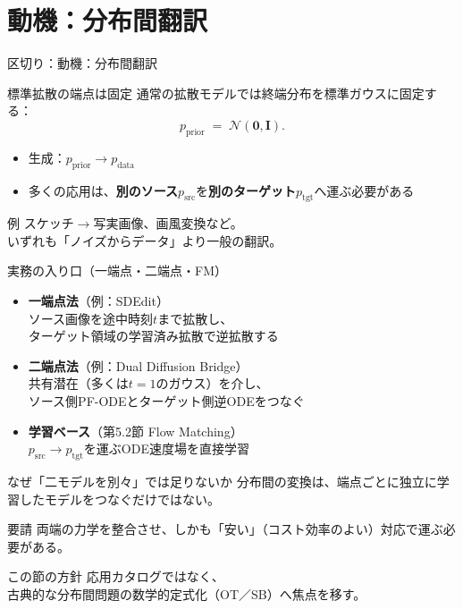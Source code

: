 \section{動機：分布間翻訳}
\asmain
\begin{frame}{区切り：動機：分布間翻訳}
    \tableofcontents[currentsection]
\end{frame}
\asmain
\begin{frame}{標準拡散の端点は固定}
    通常の拡散モデルでは終端分布を標準ガウスに固定する：
    \[
        p_{\mathrm{prior}}
        \;=\;
        \mathcal{N}(\bm{0},\bm{I}).
    \]
    \begin{itemize}
        \item 生成：$p_{\mathrm{prior}}\to p_{\mathrm{data}}$
        \item 多くの応用は、\textbf{別のソース}$p_{\mathrm{src}}$を\textbf{別のターゲット}$p_{\mathrm{tgt}}$へ運ぶ必要がある
    \end{itemize}
    \begin{exampleblock}{例}
        スケッチ$\to$写実画像、画風変換など。\\
        いずれも「ノイズからデータ」より一般の翻訳。
    \end{exampleblock}
\end{frame}
\asmain
\begin{frame}{実務の入り口（一端点・二端点・FM）}
    \begin{itemize}
        \item \textbf{一端点法}（例：SDEdit）\\
        ソース画像を途中時刻$t$まで拡散し、\\
        ターゲット領域の学習済み拡散で逆拡散する
        \item \textbf{二端点法}（例：Dual Diffusion Bridge）\\
        共有潜在（多くは$t=1$のガウス）を介し、\\
        ソース側PF-ODEとターゲット側逆ODEをつなぐ
        \item \textbf{学習ベース}（第5.2節 Flow Matching）\\
        $p_{\mathrm{src}}\to p_{\mathrm{tgt}}$を運ぶODE速度場を直接学習
    \end{itemize}
\end{frame}
\asmain
\begin{frame}{なぜ「二モデルを別々」では足りないか}
    分布間の変換は、端点ごとに独立に学習したモデルをつなぐだけではない。
    \begin{alertblock}{要請}
        両端の力学を整合させ、しかも「安い」（コスト効率のよい）対応で運ぶ必要がある。
    \end{alertblock}
    \begin{block}{この節の方針}
        応用カタログではなく、\\
        古典的な分布間問題の数学的定式化（OT／SB）へ焦点を移す。
    \end{block}
\end{frame}
